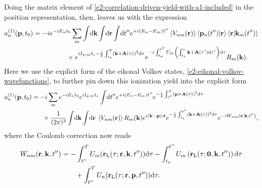Doing the matrix element of \eqref{e2-correlation-driven-yield-with-a1-included} in the position representation, then, leaves us with the expression
\begin{align}
a_n^{(1)}(\vb{p},{t_0})
& =
-i 
e^{-iE_n {t_0}}
\sum_m  \int\!\mathrm{d}\vb{k}   \int\!\mathrm{d}\vb{r}  \int\!\mathrm{d} t''
e^{+i(E_n-E_m)t''}
\left\langle V_{nm}\mathopen{}\left( \vb{r} \right)\mathclose{} \right\rangle
\braket{\vb{p}_n(t'')}{\vb{r}}
\braket{\vb{r}}{\vb{k}_m(t'')}
\nonumber \\ & \qquad \qquad \quad  \times
e^{iI_{p,m} {t_s} - \frac{i}{2} \int_{{t_s}}^{T}\left(\vb{k}+\vb{A}(\tau)\right)^2\mathrm{d}\tau }
e^{-i\int_{t_\kappa}^{t''} U_m\left(\int_{ {t_s}}^\tau \vb{k}+\vb{A}(\tau')\mathrm{d}\tau'\right) \mathrm{d}\tau}
R_m(\vb{k})
.
\label{e2-correlation-driven-yield-position-representation}
\end{align}
Here we use the explicit form of the eikonal Volkov states, \eqref{e2-eikonal-volkov-wavefunctions}, to further pin down this ionization yield into the explicit form
\begin{align}
a_n^{(1)}(\vb{p},{t_0})
& =
-i 
\sum_m 
e^{-iE_n {t_0}}
e^{iI_{p,m} {t_s}}
\int\!\mathrm{d} t''
e^{+i(E_n-E_m)t''}
e^{-\frac{i}{2} \int_{t''}^T\left(\vb{p}+\vb{A}(\tau)\right)^2\mathrm{d}\tau} 
\nonumber \\ & \quad \ \  \times
\frac{1}{(2\pi)^{3}}
\int\!\mathrm{d}\vb{k}
\int\!\mathrm{d}\vb{r} \:
\left\langle V_{nm}\mathopen{}\left( \vb{r} \right)\mathclose{} \right\rangle
R_m(\vb{k})
e^{i\left(\vb{k}-\vb{p}\right)\cdot\vb{r}} 
e^{-\frac{i}{2} \int_{{t_s}}^{t''}\left(\vb{k}+\vb{A}(\tau)\right)^2\mathrm{d}\tau} 
e^{-iW_{nm}(\vb{r},\vb{k},t'')}
,
\label{e2-correlation-driven-yield-with-eva-states}
\end{align}
where the Coulomb correction now reads
\begin{align}
W_{nm}(\vb{r},\vb{k},t'')
& =
-\int_{t''}^T U_m(\vb{r}_\mathrm{L}(\tau;\vb{r},\vb{k},t''))\mathrm{d}\tau
-\int_{t_\kappa}^{t''} U_m\left(\vb{r}_\mathrm{L}(\tau;\vb{0},\vb{k},t'')\right) \mathrm{d}\tau
\nonumber \\ & \qquad +
\int_{t''}^T U_n(\vb{r}_\mathrm{L}(\tau;\vb{r},\vb{p},t''))\mathrm{d}\tau
.
\label{e2-correlation-channel-coulomb-correction}
\end{align}


